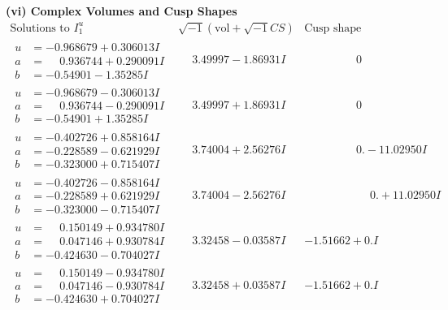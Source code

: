 \documentclass[1p]{elsarticle_modified}
\theoremstyle{definition}
\newcommand{\I}{\sqrt{-1}}
\begin{document}
\newpage\flushleft \textbf{(vi) Complex Volumes and Cusp Shapes}
$$\begin{array}{c|c|c}  
\text{Solutions to }I^u_{1}& \I (\text{vol} + \sqrt{-1}CS) & \text{Cusp shape}\\
 \hline 
\begin{aligned}
u &= -0.968679 + 0.306013 I \\
a &= \phantom{-}0.936744 + 0.290091 I \\
b &= -0.54901 - 1.35285 I\end{aligned}
 & \phantom{-}3.49997 - 1.86931 I & \phantom{-0.000000 } 0 \\ \hline\begin{aligned}
u &= -0.968679 - 0.306013 I \\
a &= \phantom{-}0.936744 - 0.290091 I \\
b &= -0.54901 + 1.35285 I\end{aligned}
 & \phantom{-}3.49997 + 1.86931 I & \phantom{-0.000000 } 0 \\ \hline\begin{aligned}
u &= -0.402726 + 0.858164 I \\
a &= -0.228589 - 0.621929 I \\
b &= -0.323000 + 0.715407 I\end{aligned}
 & \phantom{-}3.74004 + 2.56276 I & \phantom{-0.000000 } 0. - 11.02950 I \\ \hline\begin{aligned}
u &= -0.402726 - 0.858164 I \\
a &= -0.228589 + 0.621929 I \\
b &= -0.323000 - 0.715407 I\end{aligned}
 & \phantom{-}3.74004 - 2.56276 I & \phantom{-0.000000 -}0. + 11.02950 I \\ \hline\begin{aligned}
u &= \phantom{-}0.150149 + 0.934780 I \\
a &= \phantom{-}0.047146 + 0.930784 I \\
b &= -0.424630 - 0.704027 I\end{aligned}
 & \phantom{-}3.32458 - 0.03587 I & -1.51662 + 0. I\phantom{ +0.000000I} \\ \hline\begin{aligned}
u &= \phantom{-}0.150149 - 0.934780 I \\
a &= \phantom{-}0.047146 - 0.930784 I \\
b &= -0.424630 + 0.704027 I\end{aligned}
 & \phantom{-}3.32458 + 0.03587 I & -1.51662 + 0. I\phantom{ +0.000000I} \\ \hline\begin{aligned}

\end{aligned}
\end{array}$$
\end{document}
